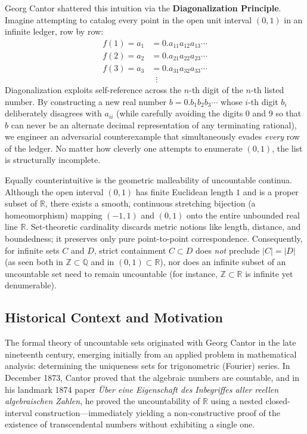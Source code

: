 \documentclass[11pt, letterpaper]{article}
\theoremstyle{definition}
\theoremstyle{remark}
\begin{document}
Georg Cantor shattered this intuition via the \textbf{Diagonalization Principle}. Imagine attempting to catalog every point in the open unit interval $(0, 1)$ in an infinite ledger, row by row:
\begin{align*}
f(1) = a_1 &= 0.a_{11}a_{12}a_{13}\cdots \\
f(2) = a_2 &= 0.a_{21}a_{22}a_{23}\cdots \\
f(3) = a_3 &= 0.a_{31}a_{32}a_{33}\cdots \\
&\;\;\vdots
\end{align*}
Diagonalization exploits self-reference across the $n$-th digit of the $n$-th listed number. By constructing a new real number $b = 0.b_1 b_2 b_3 \cdots$ whose $i$-th digit $b_i$ deliberately disagrees with $a_{ii}$ (while carefully avoiding the digits $0$ and $9$ so that $b$ can never be an alternate decimal representation of any terminating rational), we engineer an adversarial counterexample that simultaneously evades \emph{every} row of the ledger. No matter how cleverly one attempts to enumerate $(0, 1)$, the list is structurally incomplete.

Equally counterintuitive is the geometric malleability of uncountable continua. Although the open interval $(0, 1)$ has finite Euclidean length $1$ and is a proper subset of $\mathbb{R}$, there exists a smooth, continuous stretching bijection (a homeomorphism) mapping $(-1, 1)$ and $(0, 1)$ onto the entire unbounded real line $\mathbb{R}$. Set-theoretic cardinality discards metric notions like length, distance, and boundedness; it preserves only pure point-to-point correspondence. Consequently, for infinite sets $C$ and $D$, strict containment $C \subset D$ does \emph{not} preclude $|C| = |D|$ (as seen both in $\mathbb{Z} \subset \mathbb{Q}$ and in $(0, 1) \subset \mathbb{R}$), nor does an infinite subset of an uncountable set need to remain uncountable (for instance, $\mathbb{Z} \subset \mathbb{R}$ is infinite yet denumerable).

\subsection{Historical Context and Motivation}

The formal theory of uncountable sets originated with Georg Cantor in the late nineteenth century, emerging initially from an applied problem in mathematical analysis: determining the uniqueness sets for trigonometric (Fourier) series. In December 1873, Cantor proved that the algebraic numbers are countable, and in his landmark 1874 paper \emph{\"Uber eine Eigenschaft des Inbegriffes aller reellen algebraischen Zahlen}, he proved the uncountability of $\mathbb{R}$ using a nested closed-interval construction—immediately yielding a non-constructive proof of the existence of transcendental numbers without exhibiting a single one.
\end{document}
